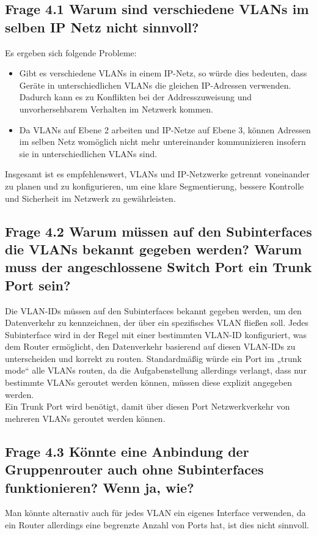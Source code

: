 \documentclass{article}
\begin{document}
\subsection*{Frage 4.1 \normalfont Warum sind verschiedene VLANs im selben IP Netz nicht sinnvoll?}
Es ergeben sich folgende Probleme:
\begin{itemize}
\item Gibt es verschiedene VLANs in einem IP-Netz, so würde dies bedeuten, dass Geräte in unterschiedlichen VLANs die gleichen IP-Adressen verwenden. Dadurch kann es zu Konflikten bei der Addresszuweisung und unvorhersehbarem Verhalten im Netzwerk kommen.
\item Da VLANs auf Ebene 2 arbeiten und IP-Netze auf Ebene 3, können Adressen im selben Netz womöglich nicht mehr untereinander kommunizieren insofern sie in unterschiedlichen VLANs sind.
\end{itemize}
Insgesamt ist es empfehlenswert, VLANs und IP-Netzwerke getrennt voneinander zu planen und zu konfigurieren, um eine klare Segmentierung, bessere Kontrolle und Sicherheit im Netzwerk zu gewährleisten.


\subsection*{Frage 4.2 \normalfont Warum müssen auf den Subinterfaces die VLANs bekannt gegeben werden? Warum muss der angeschlossene Switch Port ein Trunk Port sein?}
Die VLAN-IDs müssen auf den Subinterfaces bekannt gegeben werden, 
um den Datenverkehr zu kennzeichnen, der über ein spezifisches VLAN fließen soll. Jedes Subinterface wird in der Regel mit einer bestimmten VLAN-ID konfiguriert, was dem Router ermöglicht, den Datenverkehr
 basierend auf diesen VLAN-IDs zu unterscheiden und korrekt zu routen. Standardmäßig würde ein Port im „trunk mode“ alle VLANs routen, da die Aufgabenstellung allerdings verlangt, dass nur bestimmte VLANs geroutet werden können, müssen diese explizit angegeben werden.\\
Ein Trunk Port wird benötigt, damit über diesen Port Netzwerkverkehr von mehreren VLANs geroutet werden können.

\subsection*{Frage 4.3 \normalfont Könnte eine Anbindung der Gruppenrouter auch ohne Subinterfaces funktionieren? Wenn ja, wie?}
Man könnte alternativ auch für jedes VLAN ein eigenes Interface verwenden, da ein Router allerdings eine begrenzte Anzahl von Ports hat, ist dies nicht sinnvoll.
\end{document}
